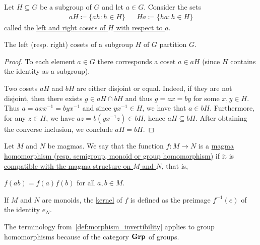 \begin{definition}\label{def:group_cosets}
  Let $H \subseteq G$ be a subgroup of $G$ and let $a \in G$. Consider the sets
  \begin{align*}
    aH \coloneqq \{ ah \colon h \in H \}
    &&
    Ha \coloneqq \{ ha \colon h \in H \}
  \end{align*}
  called the \uline{left and right cosets of $H$ with respect to $a$}.
\end{definition}

\begin{proposition}\label{thm:coset_partition}
  The left (resp. right) cosets of a subgroup $H$ of $G$ partition $G$.
\end{proposition}
\begin{proof}
  To each element $a \in G$ there corresponds a coset $a \in aH$ (since $H$ contains the identity as a subgroup).

  Two cosets $aH$ and $bH$ are either disjoint or equal. Indeed, if they are not disjoint, then there exists $g \in aH \cap bH$ and thus $g = ax = by$ for some $x, y \in H$. Thus $a = a x x^{-1} = b y x^{-1}$ and since $y x^{-1} \in H$, we have that $a \in bH$. Furthermore, for any $z \in H$, we have $az = b(y x^{-1} z) \in bH$, hence $aH \subseteq bH$. After obtaining the converse inclusion, we conclude $aH = bH$.
\end{proof}

\begin{definition}\label{def:group_homomorphism}
  Let $M$ and $N$ be magmas. We say that the function $f: M \to N$ is a \uline{magma homomorphism (resp. semigroup, monoid or group homomorphism)} if it is \uline{compatible with the magma structure on $M$ and $N$}, that is,
  \begin{description}
     $f(ab) = f(a) f(b)$ for all $a, b \in M$.
  \end{description}

  If $M$ and $N$ are monoids, the \uline{kernel} of $f$ is defined as the preimage $f^{-1}(e)$ of the identity $e_N$.

  The terminology from~\cref{def:morphism_invertibility} applies to group homomorphisms because of the category $\operatorname{\mathbf{Grp}}$ of groups.
\end{definition}

